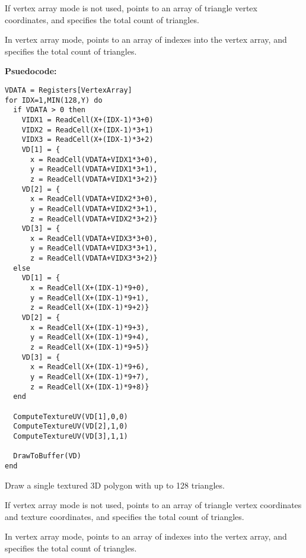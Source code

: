 If vertex array mode is not used,  points to an array of triangle vertex coordinates, and  specifies the total count of triangles.

In vertex array mode,  points to an array of indexes into the vertex array, and  specifies the total count of triangles.

\textbf{Psuedocode:}
\begin{verbatim}
VDATA = Registers[VertexArray]
for IDX=1,MIN(128,Y) do
  if VDATA > 0 then
    VIDX1 = ReadCell(X+(IDX-1)*3+0)
    VIDX2 = ReadCell(X+(IDX-1)*3+1)
    VIDX3 = ReadCell(X+(IDX-1)*3+2)
    VD[1] = {
      x = ReadCell(VDATA+VIDX1*3+0),
      y = ReadCell(VDATA+VIDX1*3+1),
      z = ReadCell(VDATA+VIDX1*3+2)}
    VD[2] = {
      x = ReadCell(VDATA+VIDX2*3+0),
      y = ReadCell(VDATA+VIDX2*3+1),
      z = ReadCell(VDATA+VIDX2*3+2)}
    VD[3] = {
      x = ReadCell(VDATA+VIDX3*3+0),
      y = ReadCell(VDATA+VIDX3*3+1),
      z = ReadCell(VDATA+VIDX3*3+2)}
  else
    VD[1] = {
      x = ReadCell(X+(IDX-1)*9+0),
      y = ReadCell(X+(IDX-1)*9+1),
      z = ReadCell(X+(IDX-1)*9+2)}
    VD[2] = {
      x = ReadCell(X+(IDX-1)*9+3),
      y = ReadCell(X+(IDX-1)*9+4),
      z = ReadCell(X+(IDX-1)*9+5)}
    VD[3] = {
      x = ReadCell(X+(IDX-1)*9+6),
      y = ReadCell(X+(IDX-1)*9+7),
      z = ReadCell(X+(IDX-1)*9+8)}
  end
    
  ComputeTextureUV(VD[1],0,0)
  ComputeTextureUV(VD[2],1,0)
  ComputeTextureUV(VD[3],1,1)
   
  DrawToBuffer(VD)
end
\end{verbatim}


Draw a single textured 3D polygon with up to 128 triangles.

If vertex array mode is not used,  points to an array of triangle vertex coordinates and texture coordinates, and  specifies the total count of triangles.

In vertex array mode,  points to an array of indexes into the vertex array, and  specifies the total count of triangles.

